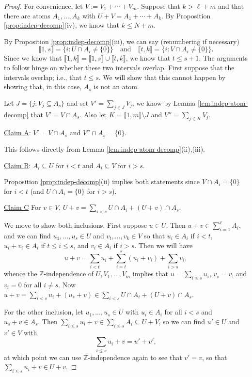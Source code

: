 \documentclass{report}
\newcommand{\ZZ}{\mathbb{Z}}
\newcommand{\llb}{\llbracket}
\newcommand{\rrb}{\rrbracket}
\renewcommand{\:}{\text{:}}
\theoremstyle{definition}
\begin{document}
\begin{proof}
For convenience, let $V := V_1 + \cdots + V_m$.
Suppose that $k > \ell + m$ and that there are atoms $A_1,\dots,A_k$ with $U+V = A_1 + \cdots + A_k$.
By Proposition \ref{prop:indep-decomp}(iv), we know that $k \le N+m$.

By Proposition \ref{prop:indep-decomp}(iii), we can say (renumbering if necessary)
\[ \llb 1,s \rrb =  \{ i: U\cap A_i \neq\{0\}\} \quad \textrm{and} \quad \llb t,k \rrb = \{i: V\cap A_i \neq \{0\}\}. \]
Since we know that $\llb 1,k \rrb = \llb 1,s \rrb \cup \llb t,k \rrb$, we know that $t \le s+1$.
The arguments to follow hinge on whether these two intervals overlap.  
First suppose that the intervals overlap; i.e., that $t \le s$.
We will show that this cannot happen by showing that, in this case, $A_s$ is not an atom.

Let $J = \{ j: V_j \subseteq A_s \}$ and set $V' = \sum_{j\in J} V_j$; we know by Lemma \ref{lem:indep-atom-decomp} that $V' = V \cap A_s$.
Also let $K = \llb 1,m \rrb \setminus J$ and $V'' = \sum_{j\in K} V_j$.

\noindent\underline{Claim A}: $V' = V\cap A_s$ and $V'' \cap A_s = \{0\}$. \label{cla}

This follows directly from Lemma \ref{lem:indep-atom-decomp}(ii),(iii).

\noindent\underline{Claim B}: $A_i \subseteq U$ for $i<t$ and $A_i \subseteq V$ for $i > s$. \label{clb}

Proposition \ref{prop:indep-decomp}(ii) implies both statements since $V \cap A_i = \{0\}$ for $i<t$ (and $U\cap A_i = \{0\}$ for $i>s$).

\noindent\underline{Claim C} For $v\in V$, $U+v = \sum\limits_{i<s} U\cap A_i + (U+v)\cap A_s$. \label{clc}

We move to show both inclusions.
First suppose $u\in U$. 
Then $u+v \in \sum_{i=1}^\ell A_i$, and we can find $u_1,\dots, u_s\in U$ and $v_t,\dots, v_k\in V$ so that
$u_i\in A_i$ if $i < t$, $u_i + v_i \in A_i$ if $t\le i \le s$, and $v_i \in A_i$ if $i > s$.
Then we will have
\[u+v = \sum_{i<t} u_i + \sum_{i=t}^{s} (u_i+v_i) + \sum_{i > s} v_i, \]
whence the $\ZZ$-independence of $U,V_1,\dots,V_m$ implies that $u = \sum_{i\le s} u_i$, $v_s = v$, and $v_i = 0$ for all $i\neq s$.
Now $u+v = \sum_{i<s} u_i + (u_s+v)\in \sum_{i<s} U\cap A_i + (U+v)\cap A_s$.

For the other inclusion, let $u_1,\dots, u_s\in U$ with $u_i\in A_i$ for all $i<s$ and $u_s + v\in A_s$.
Then $\sum_{i\le s} u_i +v \in \sum_{i\le s} A_i \subseteq U+V$, so we can find $u'\in U$ and $v'\in V$ with 
\[\sum_{i\le s}u_i + v = u' + v',\]
at which point we can use $\ZZ$-independence again to see that $v' = v$, so that $\sum_{i\le s} u_i + v\in U+v$.


\end{proof}
\end{document}
